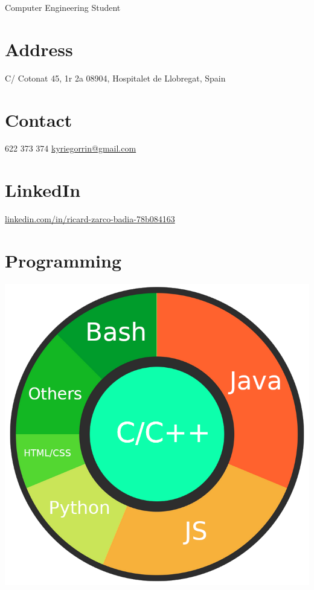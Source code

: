 \documentclass[]{friggeri-cv}
\begin{document}
      {Computer Engineering Student}
      

\begin{aside}
  \section{Address}
    C/ Cotonat 45, 1r 2a
    08904, Hospitalet de Llobregat, Spain
    ~
  \section{Contact}
    622 373 374
    \href{mailto:kyriegorrin@gmail.com}{kyriegorrin@gmail.com}
    ~
  \section{LinkedIn}
    \href{linkedin.com/in/ricard-zarco-badia-78b084163}{linkedin.com/in/ricard-zarco-badia-78b084163}
    ~
  \section{Programming}
    \includegraphics[scale=0.20]{img/programming.png}
    ~

\end{aside}
\end{document}
